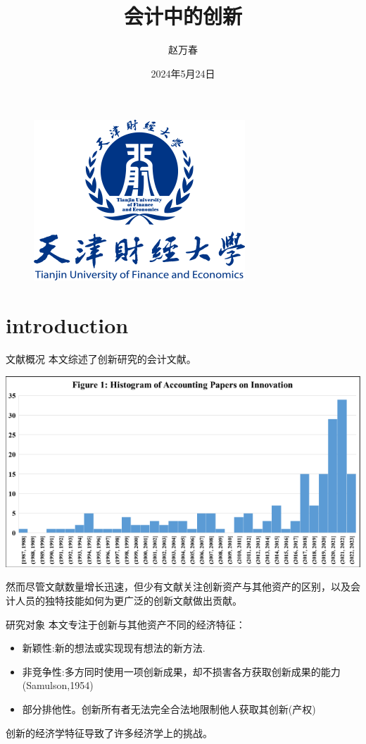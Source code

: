 \documentclass{beamer}
\author{赵万春}
\title{会计中的创新}
\subtitle{}
\institute{天津财经大学 金融学院}
\date{2024年5月24日}
\begin{document}
	
\kaishu

\begin{frame}
	\titlepage
	\begin{figure}[htpb]
		\begin{center}
			\includegraphics[width=0.2\linewidth]{pic/TJUFE_logo.png}
		\end{center}
	\end{figure}
\end{frame}	
	
\section{introduction}

\begin{frame}{文献概况}
	本文综述了创新研究的会计文献。
	\begin{center}
		\includegraphics[width=0.6\linewidth]{pic/fig1.png}
	\end{center}
	\begin{flushleft}
		然而尽管文献数量增长迅速，但少有文献关注创新资产与其他资产的区别，以及会计人员的独特技能如何为更广泛的创新文献做出贡献。
	\end{flushleft}
\end{frame}

\begin{frame}{研究对象}
	本文专注于创新与其他资产不同的经济特征：\\
	\begin{itemize}
		\item 新颖性:新的想法或实现现有想法的新方法.
		\item 非竞争性:多方同时使用一项创新成果，却不损害各方获取创新成果的能力(Samulson,1954)
		\item 部分排他性。创新所有者无法完全合法地限制他人获取其创新(产权)
	\end{itemize}
	创新的经济学特征导致了许多经济学上的挑战。
\end{frame}
\end{document}
